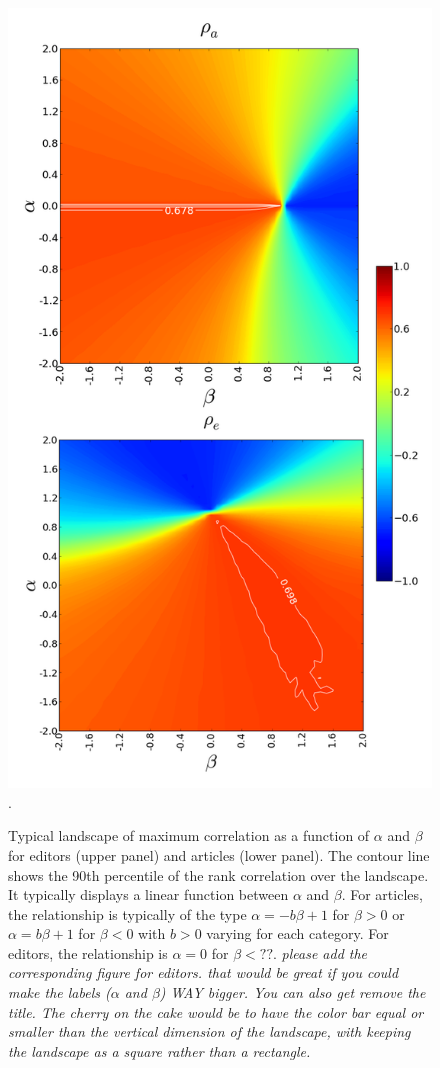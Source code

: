 \begin{figure}[!t]
\centering
\includegraphics[width=0.9\columnwidth]{Figures/contour_fem_combined.png}.
\caption{Typical landscape of maximum correlation as a function of $\alpha$ and $\beta$ for editors (upper panel) and articles (lower panel). The contour line shows the 90th percentile of the rank correlation over the landscape. It typically displays a linear function between $\alpha$ and $\beta$. For articles, the relationship is typically of the type $\alpha = - b \beta + 1$ for $\beta >0$ or $\alpha = b \beta + 1$ for $\beta < 0$ with $b>0$ varying for each category. For editors, the relationship is $\alpha = 0$ for $\beta < ??$. {\it please add the corresponding figure for editors.  that would be great if you could make the labels ($\alpha$ and $\beta$) WAY bigger. You can also get remove the title. The cherry on the cake would be to have the color bar equal or smaller than the vertical dimension of the landscape, with keeping the landscape as a square rather than a rectangle.}}
\label{fig:landscape}
\end{figure}


